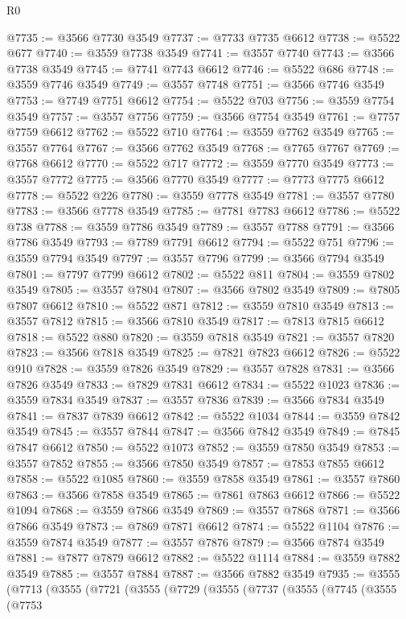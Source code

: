 \begin{lexlean}{R0}
\begin{coremodule}
@7735 := @3566 @7730 @3549
@7737 := @7733 @7735 @6612
@7738 := @5522 @677
@7740 := @3559 @7738 @3549
@7741 := @3557 @7740
@7743 := @3566 @7738 @3549
@7745 := @7741 @7743 @6612
@7746 := @5522 @686
@7748 := @3559 @7746 @3549
@7749 := @3557 @7748
@7751 := @3566 @7746 @3549
@7753 := @7749 @7751 @6612
@7754 := @5522 @703
@7756 := @3559 @7754 @3549
@7757 := @3557 @7756
@7759 := @3566 @7754 @3549
@7761 := @7757 @7759 @6612
@7762 := @5522 @710
@7764 := @3559 @7762 @3549
@7765 := @3557 @7764
@7767 := @3566 @7762 @3549
@7768 := @7765 @7767
@7769 := @7768 @6612
@7770 := @5522 @717
@7772 := @3559 @7770 @3549
@7773 := @3557 @7772
@7775 := @3566 @7770 @3549
@7777 := @7773 @7775 @6612
@7778 := @5522 @226
@7780 := @3559 @7778 @3549
@7781 := @3557 @7780
@7783 := @3566 @7778 @3549
@7785 := @7781 @7783 @6612
@7786 := @5522 @738
@7788 := @3559 @7786 @3549
@7789 := @3557 @7788
@7791 := @3566 @7786 @3549
@7793 := @7789 @7791 @6612
@7794 := @5522 @751
@7796 := @3559 @7794 @3549
@7797 := @3557 @7796
@7799 := @3566 @7794 @3549
@7801 := @7797 @7799 @6612
@7802 := @5522 @811
@7804 := @3559 @7802 @3549
@7805 := @3557 @7804
@7807 := @3566 @7802 @3549
@7809 := @7805 @7807 @6612
@7810 := @5522 @871
@7812 := @3559 @7810 @3549
@7813 := @3557 @7812
@7815 := @3566 @7810 @3549
@7817 := @7813 @7815 @6612
@7818 := @5522 @880
@7820 := @3559 @7818 @3549
@7821 := @3557 @7820
@7823 := @3566 @7818 @3549
@7825 := @7821 @7823 @6612
@7826 := @5522 @910
@7828 := @3559 @7826 @3549
@7829 := @3557 @7828
@7831 := @3566 @7826 @3549
@7833 := @7829 @7831 @6612
@7834 := @5522 @1023
@7836 := @3559 @7834 @3549
@7837 := @3557 @7836
@7839 := @3566 @7834 @3549
@7841 := @7837 @7839 @6612
@7842 := @5522 @1034
@7844 := @3559 @7842 @3549
@7845 := @3557 @7844
@7847 := @3566 @7842 @3549
@7849 := @7845 @7847 @6612
@7850 := @5522 @1073
@7852 := @3559 @7850 @3549
@7853 := @3557 @7852
@7855 := @3566 @7850 @3549
@7857 := @7853 @7855 @6612
@7858 := @5522 @1085
@7860 := @3559 @7858 @3549
@7861 := @3557 @7860
@7863 := @3566 @7858 @3549
@7865 := @7861 @7863 @6612
@7866 := @5522 @1094
@7868 := @3559 @7866 @3549
@7869 := @3557 @7868
@7871 := @3566 @7866 @3549
@7873 := @7869 @7871 @6612
@7874 := @5522 @1104
@7876 := @3559 @7874 @3549
@7877 := @3557 @7876
@7879 := @3566 @7874 @3549
@7881 := @7877 @7879 @6612
@7882 := @5522 @1114
@7884 := @3559 @7882 @3549
@7885 := @3557 @7884
@7887 := @3566 @7882 @3549
@7935 := @3555
    (@7713
      (@3555
        (@7721
          (@3555
            (@7729
              (@3555
                (@7737
                  (@3555
                    (@7745
                      (@3555
                        (@7753

\end{coremodule}
\end{lexlean}
